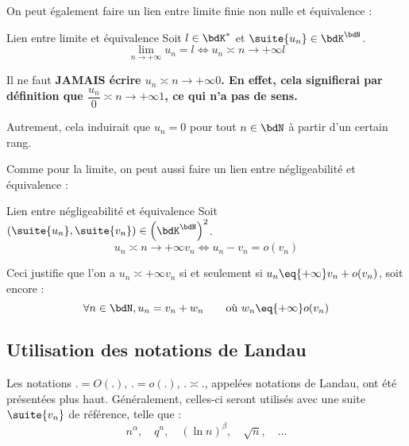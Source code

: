 \documentclass[a4paper,french,bookmarks]{article}
\begin{document}
On peut également faire un lien entre limite finie non nulle et équivalence :

\begin{property}{Lien entre limite et équivalence}{}
    Soit $l \in \bdK^*$ et $\suite{u_n} \in \bdK^\bdN$.
    \[ \lim\limits_{n \to +\infty} u_n = l \iff u_n \asymp{n \to +\infty} l\]
\end{property}

\begin{warning}{}{}
    Il ne faut \bf{JAMAIS} écrire $u_n \asymp{n \to +\infty} 0$. En effet, cela signifierai par définition que $\dfrac{u_n}{0} \asymp{n \to +\infty} 1$, ce qui n'a pas de sens.
    
    Autrement, cela induirait que $u_n = 0$ pour tout $n \in \bdN$ à partir d'un certain rang. 
    
\end{warning}

Comme pour la limite, on peut aussi faire un lien entre négligeabilité et équivalence :

\begin{property}{Lien entre négligeabilité et équivalence}{}
     Soit $\left(\suite{u_n},\suite{v_n}\right) \in \left(\bdK^\bdN\right)^2$.
     \[ u_n \asymp{n \to +\infty} v_n \iff u_n - v_n = o(v_n)\]
\end{property}


Ceci justifie que l'on a $u_n \asymp{+\infty} v_n$ si et seulement si $u_n \eq{+\infty} v_n + o(v_n)$, soit encore :
\[ \forall n \in \bdN, u_n = v_n + w_n \qquad \text{où} \ w_n \eq{+\infty} o(v_n)\]

\subsection{Utilisation des notations de Landau}


Les notations $. = O(.)$, $. = o(.)$, $. \asymp .$, appelées notations de Landau, ont été présentées plus haut. Généralement, celles-ci seront utilisés avec une suite $\suite{v_n}$ de référence, telle que :
\[ n^\alpha,\quad q^n,\quad \left(\ln n\right)^\beta,\quad \sqrt{n},\quad \dots\]
\end{document}

